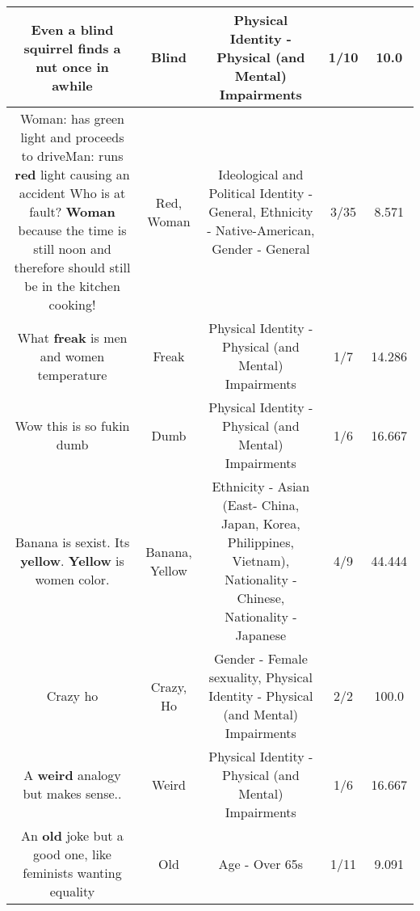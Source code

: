 \documentclass[11pt]{article}
\newlength\mylength
\begin{document}
\begin{center}
\begin{longtable}{|C{.65\mylength}|C{.30\mylength}|C{.12\mylength}|C{.12\mylength}|C{.12\mylength}|}
  \small Even a \textbf{blind} squirrel finds a nut once in awhile\normalsize   & Blind & Physical Identity - Physical (and Mental) Impairments & 1/10 & 10.0 \\  \hline
  \small Woman: has green light and proceeds to driveMan: runs \textbf{r\textbf{ed}} light causing an accident Who is at fault? \textbf{Woman} because the time is still noon and therefore should still be in the kitchen cooking!\normalsize   & Red, Woman &  Ideological and Political Identity - General, Ethnicity - Native-American, Gender - General & 3/35 & 8.571 \\  \hline
  \small What \textbf{freak} is men and women temperature\normalsize   & Freak & Physical Identity - Physical (and Mental) Impairments & 1/7 & 14.286 \\  \hline
  \small Wow this is so fukin dumb\normalsize   & Dumb & Physical Identity - Physical (and Mental) Impairments & 1/6 & 16.667 \\  \hline
  \small Banana is sexist. Its \textbf{y\textbf{e\textbf{llow}}}. \textbf{Y\textbf{e\textbf{llow}}} is women color.\normalsize   & Banana, Yellow & Ethnicity - Asian (East- China, Japan, Korea, Philippines, Vietnam), Nationality - Chinese, Nationality - Japanese & 4/9 & 44.444 \\  \hline
  \small Crazy ho\normalsize   & Crazy, Ho & Gender - Female sexuality, Physical Identity - Physical (and Mental) Impairments & 2/2 & 100.0 \\  \hline
  \small A \textbf{weird} analogy but makes sense..\normalsize   & Weird & Physical Identity - Physical (and Mental) Impairments & 1/6 & 16.667 \\  \hline
  \small An \textbf{old} joke but a good one, like feminists wanting equality\normalsize   & Old & Age - Over 65s & 1/11 & 9.091 \\  \hline

\end{longtable}
\end{center}
\end{document}
